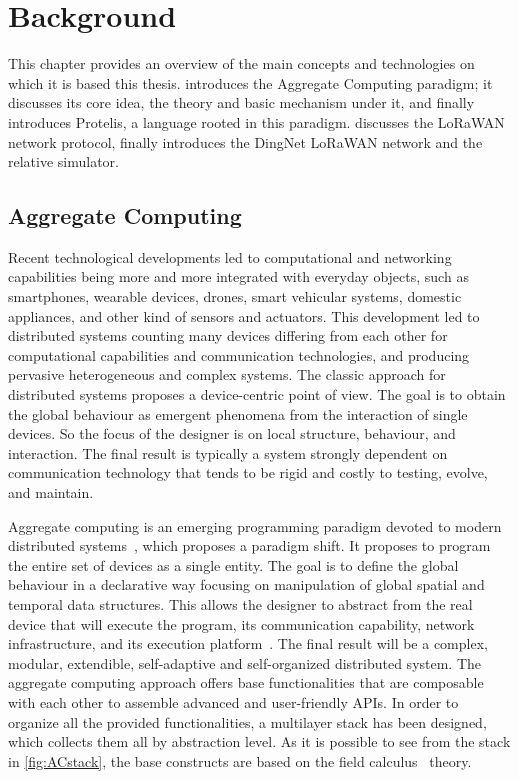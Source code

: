\chapter{Background}
\label{chap:background}
This chapter provides an overview of the main concepts and technologies on which it is based this thesis.  introduces the Aggregate Computing paradigm; it discusses its core idea, the theory and basic mechanism under it, and finally introduces Protelis, a language rooted in this paradigm. 
 discusses the LoRaWAN network protocol, 
finally  introduces the DingNet LoRaWAN network and the relative simulator. 

\section{Aggregate Computing}
\label{sec:AC}
Recent technological developments led to computational and networking capabilities being more and more integrated with everyday objects, such as smartphones, wearable devices, drones, smart vehicular systems, domestic appliances, and other kind of sensors and actuators.
% 
This development led to distributed systems counting many devices differing from each other for computational capabilities and communication technologies, and producing pervasive heterogeneous and complex systems.
% 
The classic approach for distributed systems proposes a device-centric point of view.
% 
The goal is to obtain the global behaviour as emergent phenomena from the interaction of single devices. 
% 
So the focus of the designer is on local structure, behaviour, and interaction. 
% 
The final result is typically a system strongly dependent on communication technology that tends to be rigid and costly to testing, evolve, and maintain.
 
Aggregate computing is an emerging programming paradigm devoted to modern distributed systems~\cite{BealIEEEComputer2015}, which proposes a paradigm shift. 
% 
It proposes to program the entire set of devices as a single entity.
% 
The goal is to define the global behaviour in a declarative way focusing on manipulation of global spatial and temporal data structures. This allows the designer to abstract from the real device that will execute the program, its communication capability, network infrastructure, and its execution platform~\cite{ViroliUbiComp2016}. 
% 
The final result will be a complex, modular, extendible, self-adaptive and self-organized distributed system.
% 
The aggregate computing approach offers base functionalities that are composable with each other to assemble advanced and user-friendly APIs. 
In order to organize all the provided functionalities, a multilayer stack has been designed, which collects them all by abstraction level. 
As it is possible to see from the stack in \autoref{fig:ACstack}, the base constructs are based on the field calculus~\cite{Audrito2019} theory.

